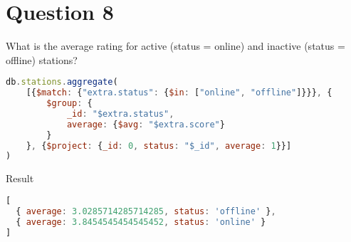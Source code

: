 \section{Question 8}

\begin{question}
  What is the average rating for active (status = online) and inactive
  (status = offline) stations?
\end{question}

\begin{answer}

  \begin{lstlisting}[language=js]
db.stations.aggregate(
    [{$match: {"extra.status": {$in: ["online", "offline"]}}}, {
        $group: {
            _id: "$extra.status",
            average: {$avg: "$extra.score"}
        }
    }, {$project: {_id: 0, status: "$_id", average: 1}}]
)
  \end{lstlisting}
  Result
  \begin{lstlisting}[language=js]
[
  { average: 3.0285714285714285, status: 'offline' },
  { average: 3.8454545454545452, status: 'online' }
]
  \end{lstlisting}

\end{answer}
